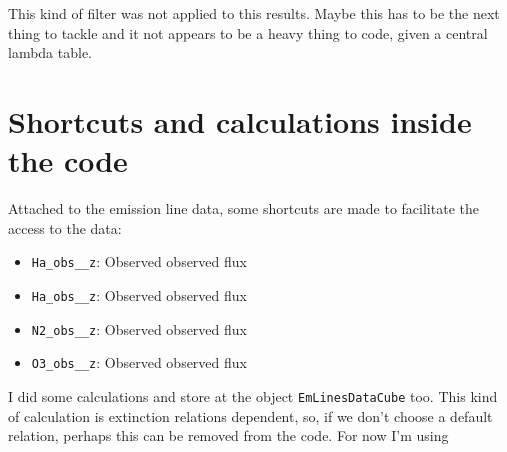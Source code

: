 \documentclass[a4paper,11pt]{article}
\begin{document}
This kind of filter was not applied to this results. Maybe this has to be the next thing to tackle and it not appears to be a heavy thing to code, given a central lambda table. 


%

%

\section{Shortcuts and calculations inside the code}

Attached to the emission line data, some shortcuts are made to facilitate the access to the data:

\begin{itemize}
	\item \texttt{Ha\_obs\_\_z}: Observed \Halpha observed flux \
	\item \texttt{Ha\_obs\_\_z}: Observed \Hbeta observed flux \
	\item \texttt{N2\_obs\_\_z}: Observed \NII observed flux \
	\item \texttt{O3\_obs\_\_z}: Observed \OIII observed flux 
\end{itemize}

I did some calculations and store at the object \texttt{EmLinesDataCube} too. This kind of calculation is extinction relations dependent, so, if we don't choose a default relation, perhaps this can be removed from the code. For now I'm using \citet{CCM1989a}
\end{document}
